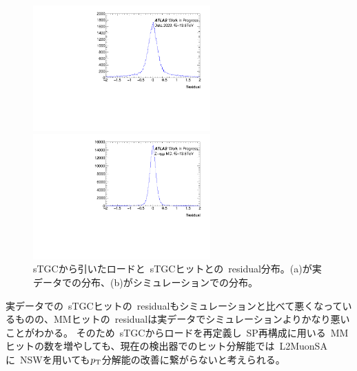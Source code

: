 \begin{figure}[h]
        \begin{minipage}[b]{0.48\linewidth}
            \centering
            \includegraphics[clip, width=6.8cm]{fig/5/residualNewAlg_stgc.pdf}
        \end{minipage}
        \begin{minipage}[b]{0.48\linewidth}
            \centering
            \includegraphics[clip, width=6.8cm]{fig/5/residualNewAlg_stgc_MC.pdf}
        \end{minipage}
    \caption{sTGCから引いたロードと~sTGCヒットとの~residual分布。(a)が実データでの分布、(b)がシミュレーションでの分布。}
    \label{fig:stgcresidualDataMC}
\end{figure}

実データでの~sTGCヒットの~residualもシミュレーションと比べて悪くなっているものの、MMヒットの~residualは実データでシミュレーションよりかなり悪いことがわかる。
そのため~sTGCからロードを再定義し~SP再構成に用いる~MMヒットの数を増やしても、現在の検出器でのヒット分解能では~L2MuonSAに~NSWを用いても$p_\mathrm{T}$分解能の改善に繋がらないと考えられる。
